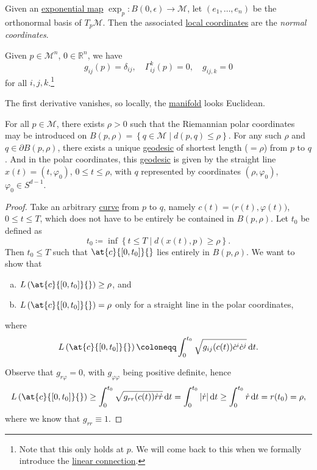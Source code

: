 \begin{definition}\label{def:normal-coordinate}
	Given an \hyperref[def:exponential-map]{exponential map} \(\exp _p\colon B(0, \epsilon ) \to \mathcal{M} \), let \((e_1, \ldots , e_n)\) be the orthonormal basis of \(T_p \mathcal{M} \). Then the associated \hyperref[def:coordinate-chart]{local coordinates} are the \emph{normal coordinates}.
\end{definition}

Given \(p\in \mathcal{M} ^n\), \(0\in \mathbb{R} ^n\), we have
\[
	g_{ij}(p) = \delta_{ij},\quad \Gamma _{ij}^k(p) = 0,\quad g_{ij, k} = 0
\]
for all \(i, j, k\).\footnote{Note that this only holds at \(p\). We will come back to this when we formally introduce the \hyperref[def:linear-connection]{linear connection}.}

\begin{note}
	The first derivative vanishes, so locally, the \hyperref[def:Riemannian-manifold]{manifold} looks Euclidean.
\end{note}

\begin{theorem}\label{thm:shortest-geodesic}
	For all \(p\in \mathcal{M} \), there exists \(\rho > 0\) such that the Riemannian polar coordinates may be introduced on \(B(p, \rho ) = \left\{ q\in \mathcal{M} \mid d(p, q) \leq \rho  \right\} \). For any such \(\rho \) and \(q\in \partial B(p, \rho )\), there exists a unique \hyperref[def:geodesic]{geodesic} of shortest length (\(=\rho \)) from \(p\) to \(q\). And in the polar coordinates, this \hyperref[def:geodesic]{geodesic} is given by the straight line \(x(t) = (t, \varphi _0)\), \(0 \leq t \leq \rho \), with \(q\) represented by coordinates \((\rho , \varphi _0)\), \(\varphi _0\in S^{d-1}\).
\end{theorem}
\begin{proof}
	Take an arbitrary \hyperref[def:curve]{curve} from \(p\) to \(q\), namely \(c(t) = \big(r(t), \varphi (t)\big)\), \(0 \leq t \leq T\), which does not have to be entirely be contained in \(B(p, \rho )\). Let \(t_0\) be defined as
	\[
		t_0 \coloneqq \inf \left\{ t \leq T \mid d(x(t), p) \geq \rho  \right\}.
	\]
	Then \(t_0 \leq T\) such that \(\at{c}{[0, t_0]}{} \) lies entirely in \(B(p, \rho )\). We want to show that
	\begin{enumerate}[(a)]
		\item \(L\left( \at{c}{[0, t_0]}{} \right) \geq \rho \), and
		\item \(L\left( \at{c}{[0, t_0]}{} \right) = \rho \) only for a straight line in the polar coordinates,
	\end{enumerate}
	where
	\[
		L\left( \at{c}{[0 ,t_0]}{} \right) \coloneqq \int_{0}^{t_0} \sqrt{g_{ij}(c(t)) \dot{c}^i \dot{c}^j} \,\mathrm{d}t.
	\]

	Observe that \(g_{r \varphi } = 0\), with \(g_{\varphi \varphi }\) being positive definite, hence
	\[
		L\left( \at{c}{[0, t_0]}{} \right)
		\geq \int_{0}^{t_0} \sqrt{g_{r r}(c(t)) \dot{r} \dot{r}} \,\mathrm{d}t
		= \int_{0}^{t_0} \vert \dot{r} \vert \,\mathrm{d}t
		\geq \int_{0}^{t_0} \dot{r} \,\mathrm{d}t
		= r(t_0)
		= \rho,
	\]
	where we know that \(g_{r r} \equiv 1\).
\end{proof}

